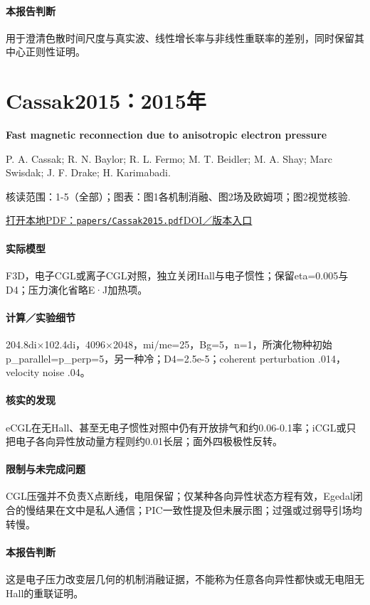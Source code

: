 \paragraph{本报告判断}用于澄清色散时间尺度与真实波、线性增长率与非线性重联率的差别，同时保留其中心正则性证明。

\section{Cassak2015：2015年}\label{paper:Cassak2015}

\textbf{Fast magnetic reconnection due to anisotropic electron pressure}\citep{Cassak2015}\

P. A. Cassak;  R. N. Baylor;  R. L. Fermo;  M. T. Beidler;  M. A. Shay;  Marc Swisdak;  J. F. Drake;  H. Karimabadi.

\textsf{核读范围：}1-5（全部）；\textsf{图表：}图1各机制消融、图2场及欧姆项；图2视觉核验.

\href{run:papers/Cassak2015.pdf}{打开本地PDF：\texttt{papers/Cassak2015.pdf}}\quad\href{https://doi.org/10.1063/1.4908545}{DOI／版本入口}

\paragraph{实际模型}F3D，电子CGL或离子CGL对照，独立关闭Hall与电子惯性；保留eta=0.005与D4；压力演化省略E·J加热项。

\paragraph{计算／实验细节}204.8di×102.4di，4096×2048，mi/me=25，Bg=5，n=1，所演化物种初始p\_parallel=p\_perp=5，另一种冷；D4=2.5e-5；coherent perturbation .014，velocity noise .04。

\paragraph{核实的发现}eCGL在无Hall、甚至无电子惯性对照中仍有开放排气和约0.06-0.1率；iCGL或只把电子各向异性放动量方程则约0.01长层；面外四极极性反转。

\paragraph{限制与未完成问题}CGL压强并不负责X点断线，电阻保留；仅某种各向异性状态方程有效，Egedal闭合的慢结果在文中是私人通信；PIC一致性提及但未展示图；过强或过弱导引场均转慢。

\paragraph{本报告判断}这是电子压力改变层几何的机制消融证据，不能称为任意各向异性都快或无电阻无Hall的重联证明。

